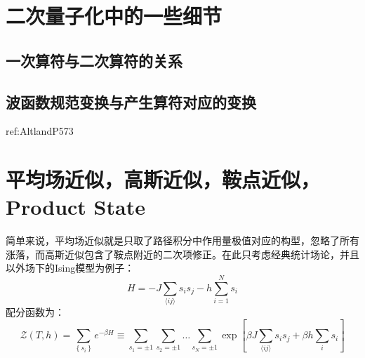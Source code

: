 \documentclass[10pt,openany]{book}
\theoremstyle{thmstyle} %
\theoremstyle{defstyle} %
\theoremstyle{prostyle} %
\begin{document}
\section{二次量子化中的一些细节}
\subsection{一次算符与二次算符的关系}
\subsection{波函数规范变换与产生算符对应的变换}
ref:AltlandP573
\section{平均场近似，高斯近似，鞍点近似，Product State}
简单来说，平均场近似就是只取了路径积分中作用量极值对应的构型，忽略了所有涨落，而高斯近似包含了鞍点附近的二次项修正。在此只考虑经典统计场论，并且以外场下的Ising模型为例子：
\begin{equation}
  H=-J \sum_{\langle i j\rangle} s_i s_j-h \sum_{i=1}^N s_i
\end{equation}
配分函数为：
\begin{equation}
  \mathcal{Z}(T, h)=\sum_{\left\{s_i\right\}} e^{-\beta H} \equiv \sum_{s_1= \pm 1} \sum_{s_2= \pm 1} \ldots \sum_{s_N= \pm 1} \exp \left[\beta J \sum_{\langle i j\rangle} s_i s_j+\beta h \sum_i s_i\right]
\end{equation}
\end{document}

